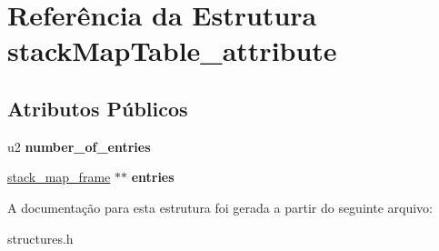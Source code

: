 \hypertarget{structstackMapTable__attribute}{}\section{Referência da Estrutura stack\+Map\+Table\+\_\+attribute}
\label{structstackMapTable__attribute}
\subsection*{Atributos Públicos}
\begin{DoxyCompactItemize}
\item 
\mbox{\label{structstackMapTable__attribute_a3bccf778bae6ecac485fb942eb82a478}} 
u2 {\bfseries number\+\_\+of\+\_\+entries}
\item 
\mbox{\label{structstackMapTable__attribute_a064170c738925362875e3337defc60d0}} 
\hyperlink{structstack__map__frame}{stack\+\_\+map\+\_\+frame} $\ast$$\ast$ {\bfseries entries}
\end{DoxyCompactItemize}


A documentação para esta estrutura foi gerada a partir do seguinte arquivo\+:\begin{DoxyCompactItemize}
\item 
structures.\+h\end{DoxyCompactItemize}
